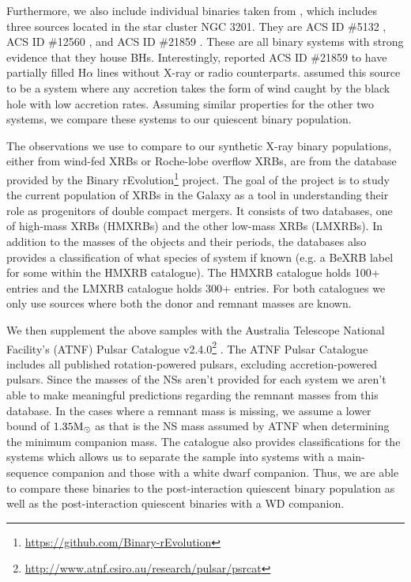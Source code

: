 \documentclass{pas}
\begin{document}
Furthermore, we also include individual binaries taken from \citet{Paduano_2021}, which includes three sources located in the star cluster NGC 3201. They are ACS ID \#5132 \cite[first reported in][]{Giesers2019}, ACS ID \#12560 \citep{Giesers2018}, and ACS ID \#21859 \citep{Giesers2019}. These are all binary systems with strong evidence that they house BHs. Interestingly, \citet{Giesers2019} reported ACS ID \#21859 to have partially filled H$\alpha$ lines without X-ray or radio counterparts. \citet{Paduano_2021} assumed this source to be a system where any accretion takes the form of wind caught by the black hole with low accretion rates. Assuming similar properties for the other two systems, we compare these systems to our quiescent binary population.

The observations we use to compare to our synthetic X-ray binary populations, either from wind-fed XRBs or Roche-lobe overflow XRBs, are from the database provided by the Binary rEvolution\footnote{\url{https://github.com/Binary-rEvolution}} project. The goal of the project is to study the current population of XRBs in the Galaxy as a tool in understanding their role as progenitors of double compact mergers. It consists of two databases, one of high-mass XRBs (HMXRBs) and the other low-mass XRBs (LMXRBs). In addition to the masses of the objects and their periods, the databases also provides a classification of what species of system if known (e.g. a BeXRB label for some within the HMXRB catalogue). The HMXRB catalogue holds 100+ entries and the LMXRB catalogue holds 300+ entries. For both catalogues we only use sources where both the donor and remnant masses are known.

We then supplement the above samples with the Australia Telescope National Facility's (ATNF) Pulsar Catalogue v2.4.0\footnote{\url{http://www.atnf.csiro.au/research/pulsar/psrcat}} \citep{Manchester_2005}. The ATNF Pulsar Catalogue includes all published rotation-powered pulsars, excluding accretion-powered pulsars. Since the masses of the NSs aren't provided for each system we aren't able to make meaningful predictions regarding the remnant masses from this database. In the cases where a remnant mass is missing, we assume a lower bound of $1.35\rm{M_\odot}$ as that is the NS mass assumed by ATNF when determining the minimum companion mass. The catalogue also provides classifications for the systems which allows us to separate the sample into systems with a main-sequence companion and those with a white dwarf companion. Thus, we are able to compare these binaries to the post-interaction quiescent binary population as well as the post-interaction quiescent binaries with a WD companion.
\end{document}
